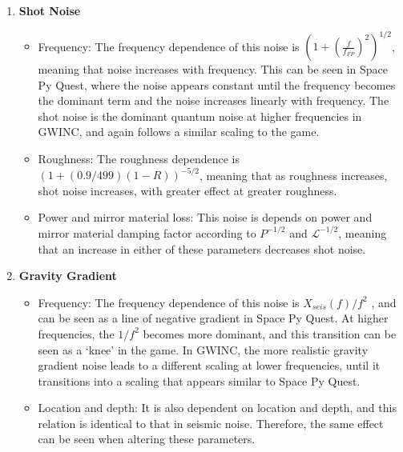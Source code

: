 \documentclass{article}
\begin{document}
\begin{enumerate}
    \item \textbf{Shot Noise}
    \begin{itemize}
    \item Frequency: The frequency dependence of this noise is
      $(1+\left(\frac{f}{f_{FP}}\right)^2)^{1/2}$, meaning that noise
      increases with frequency. This can be seen in Space Py Quest,
      where the noise appears constant until the frequency becomes the
      dominant term and the noise increases linearly with
      frequency. The shot noise is the dominant quantum noise at
      higher frequencies in GWINC, and again follows a similar scaling
      to the game. 
    \item Roughness: The roughness dependence is
      $(1+(0.9/499)(1-R))^{-5/2}$, meaning that as roughness
      increases, shot noise increases, with greater effect at greater
      roughness. 
    \item Power and mirror material loss: This noise is depends on
      power and mirror material damping factor according to $P^{-1/2}$
      and $\mathcal{L}^{-1/2}$, meaning that an increase in either of
      these parameters decreases shot noise.
    \end{itemize}
    
    \item \textbf{Gravity Gradient}
    \begin{itemize}
    \item Frequency: The frequency dependence of this noise is
      $X_{seis}(f)/f^2$ , and can be seen as a line of negative
      gradient in Space Py Quest. At higher frequencies, the $1/f^2$
      becomes more dominant, and this transition can be seen as a
      `knee' in the game. In GWINC, the more realistic gravity
      gradient noise leads to a different scaling at lower
      frequencies, until it transitions into a scaling that appears
      similar to Space Py Quest. 
    \item Location and depth: It is also dependent on location and
      depth, and this relation is identical to that in seismic
      noise. Therefore, the same effect can be seen when altering
      these parameters. 
    \end{itemize}
    

\end{enumerate}
\end{document}
